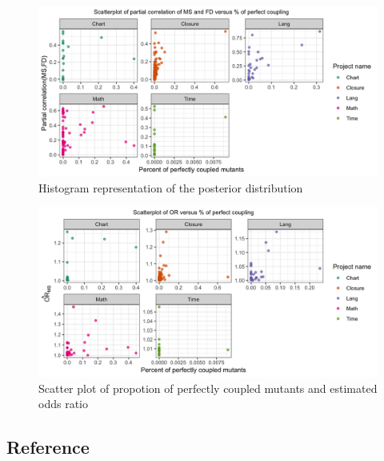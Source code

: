 \documentclass[10pt,letterpaper]{article}
\begin{document}
  
    \begin{figure}[ht!]
        \centering
        \includegraphics[scale=0.15]{figures/couple_partial_cor.png}
        \caption{Histogram representation of the posterior distribution}
        \label{fig:couple_partial_cor}
    \end{figure}



  \begin{figure}[ht!]
        \centering
        \includegraphics[scale=0.15]{figures/couple_OR.png}
        \caption{Scatter plot of propotion of perfectly coupled mutants and estimated odds ratio }
        \label{fig:couple_OR}
    \end{figure}

\subsection*{Reference}






\end{document}
